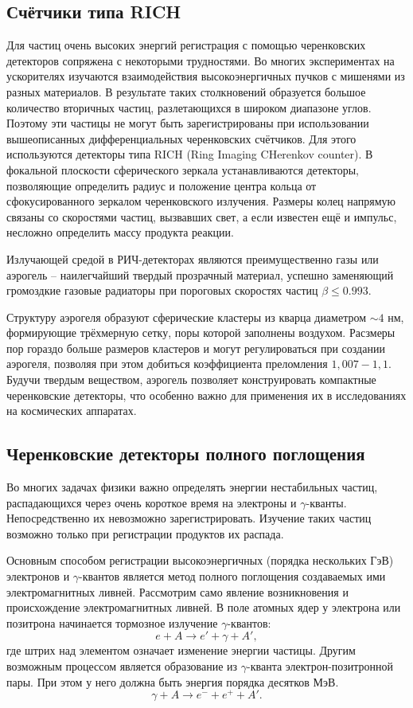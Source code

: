 \begin{main}
	\subsection{Счётчики типа RICH}
	\label{sec:subsection}
	Для частиц очень высоких энергий регистрация с помощью черенковских детекторов сопряжена с некоторыми трудностями.
	Во многих экспериментах на ускорителях изучаются взаимодействия высокоэнергичных пучков с мишенями из разных материалов.
	В результате таких столкновений образуется большое количество вторичных частиц, разлетающихся в широком диапазоне углов.
	Поэтому  эти частицы не могут быть зарегистрированы при использовании вышеописанных дифференциальных черенковских счётчиков.
	Для этого используются детекторы типа RICH (Ring Imaging CHerenkov counter). 
	В фокальной плоскости сферического зеркала устанавливаются детекторы, позволяющие определить радиус и положение центра кольца от сфокусированного зеркалом черенковского излучения. 
	Размеры колец напрямую связаны со скоростями частиц, вызвавших свет, а если известен ещё и импульс, несложно определить массу продукта реакции. 
	
	Излучающей средой в РИЧ-детекторах являются преимущественно газы или аэрогель – наилегчайший твердый прозрачный материал, успешно заменяющий громоздкие газовые радиаторы при пороговых скоростях частиц $\beta \leq 0.993$.
	
	Структуру аэрогеля образуют сферические кластеры из кварца диаметром $ \sim 4 $ нм, формирующие трёхмерную сетку, поры которой заполнены воздухом. 
	Расзмеры пор гораздо больше размеров кластеров и могут регулироваться при создании аэрогеля, позволяя при этом добиться коэффициента преломления $ 1,007 - 1,1 $.
	Будучи твердым веществом, аэрогель позволяет конструировать компактные черенковские детекторы, что особенно важно для применения их в исследованиях на космических аппаратах. 
	
	\subsection{Черенковские детекторы полного поглощения}
	\label{sec:subsection}
	
	Во многих задачах физики важно определять энергии нестабильных частиц, распадающихся через очень короткое время на электроны и $ \gamma $-кванты.
	Непосредственно их невозможно зарегистрировать.
	Изучение таких частиц возможно только при регистрации продуктов их распада.
	
	Основным способом регистрации высокоэнергичных (порядка нескольких ГэВ) электронов и $ \gamma $-квантов является метод полного поглощения создаваемых ими электромагнитных ливней.
	 Рассмотрим само явление возникновения и происхождение электромагнитных ливней. 
	В поле атомных ядер у электрона или позитрона начинается тормозное излучение $\gamma$-квантов: $$e + A \longrightarrow e' + \gamma + A',$$ где штрих над элементом означает изменение энергии частицы. 
	Другим возможным процессом является образование из $
	\gamma$-кванта электрон-позитронной пары.
	При этом у него должна быть энергия порядка десятков МэВ. $$\gamma + A \longrightarrow e^- + e^+ + A'.$$
	

\end{main}
